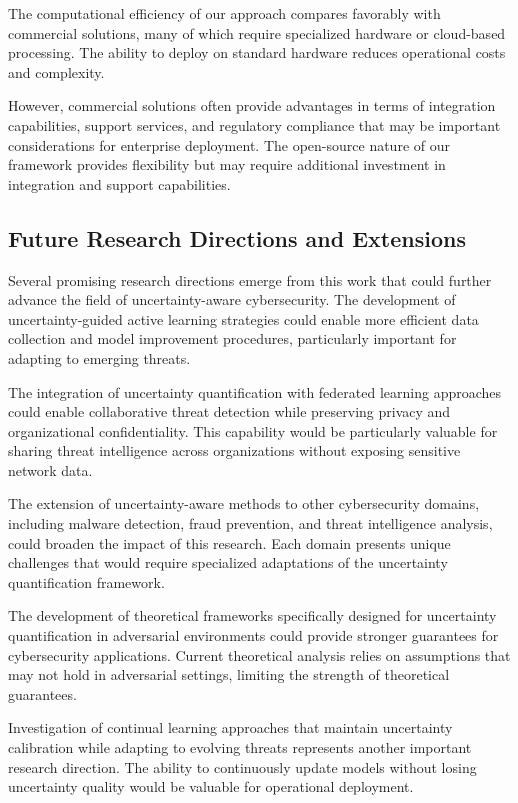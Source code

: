 \documentclass[journal]{IEEEtran}
\begin{document}
The computational efficiency of our approach compares favorably with commercial solutions, many of which require specialized hardware or cloud-based processing. The ability to deploy on standard hardware reduces operational costs and complexity.

However, commercial solutions often provide advantages in terms of integration capabilities, support services, and regulatory compliance that may be important considerations for enterprise deployment. The open-source nature of our framework provides flexibility but may require additional investment in integration and support capabilities.

\subsection{Future Research Directions and Extensions}

Several promising research directions emerge from this work that could further advance the field of uncertainty-aware cybersecurity. The development of uncertainty-guided active learning strategies could enable more efficient data collection and model improvement procedures, particularly important for adapting to emerging threats.

The integration of uncertainty quantification with federated learning approaches could enable collaborative threat detection while preserving privacy and organizational confidentiality. This capability would be particularly valuable for sharing threat intelligence across organizations without exposing sensitive network data.

The extension of uncertainty-aware methods to other cybersecurity domains, including malware detection, fraud prevention, and threat intelligence analysis, could broaden the impact of this research. Each domain presents unique challenges that would require specialized adaptations of the uncertainty quantification framework.

The development of theoretical frameworks specifically designed for uncertainty quantification in adversarial environments could provide stronger guarantees for cybersecurity applications. Current theoretical analysis relies on assumptions that may not hold in adversarial settings, limiting the strength of theoretical guarantees.

Investigation of continual learning approaches that maintain uncertainty calibration while adapting to evolving threats represents another important research direction. The ability to continuously update models without losing uncertainty quality would be valuable for operational deployment.
\end{document}
